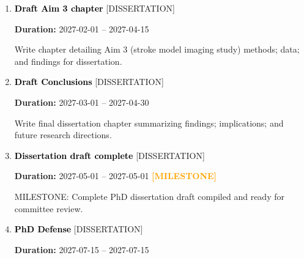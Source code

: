 \documentclass[landscape,a4paper]{article}
\begin{document}
\begin{enumerate}[leftmargin=1.5cm, itemsep=1em]
    \item \textcolor{black}{\textbf{\large Draft Aim 3 chapter}}
          \hfill \textcolor{black!60}{\small [DISSERTATION]}
          
          \vspace{0.2em}
          \textcolor{black!70}{\textbf{Duration:} 2027-02-01 -- 2027-04-15}

          \vspace{0.4em}
          \begin{minipage}[t]{0.9\textwidth}
          \textcolor{black!85}{Write chapter detailing Aim 3 (stroke model imaging study) methods; data; and findings for dissertation.}
          \end{minipage}


    \item \textcolor{black}{\textbf{\large Draft Conclusions}}
          \hfill \textcolor{black!60}{\small [DISSERTATION]}
          
          \vspace{0.2em}
          \textcolor{black!70}{\textbf{Duration:} 2027-03-01 -- 2027-04-30}

          \vspace{0.4em}
          \begin{minipage}[t]{0.9\textwidth}
          \textcolor{black!85}{Write final dissertation chapter summarizing findings; implications; and future research directions.}
          \end{minipage}


    \item \textcolor{black}{\textbf{\large Dissertation draft complete}}
          \hfill \textcolor{black!60}{\small [DISSERTATION]}
          
          \vspace{0.2em}
          \textcolor{black!70}{\textbf{Duration:} 2027-05-01 -- 2027-05-01}
          \textcolor{orange}{\textbf{ [MILESTONE]}}\n
          \vspace{0.4em}
          \begin{minipage}[t]{0.9\textwidth}
          \textcolor{black!85}{MILESTONE: Complete PhD dissertation draft compiled and ready for committee review.}
          \end{minipage}


    \item \textcolor{black}{\textbf{\large PhD Defense}}
          \hfill \textcolor{black!60}{\small [DISSERTATION]}
          
          \vspace{0.2em}
          \textcolor{black!70}{\textbf{Duration:} 2027-07-15 -- 2027-07-15}


\end{enumerate}
\end{document}
